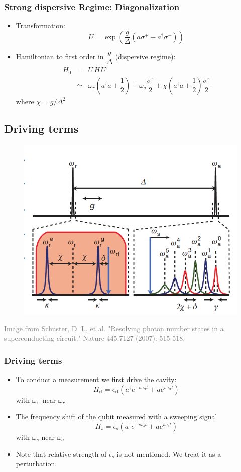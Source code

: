 \documentclass[xcolor=dvipsnames,hyperref={CJKbookmarks=true}]{beamer}
\newcommand{\rf}{\text{rf}}
\begin{document}
\begin{frame}
\frametitle{Strong dispersive Regime: Diagonalization}
\begin{itemize}
\item Transformation: 
$$U=\exp{\left(\dfrac{g}{\Delta}\left(a\sigma^{+}-a^{\dagger}\sigma^{-} \right)\right)}$$
\item Hamiltonian to first order in $\dfrac{g}{\Delta}$ (dispersive regime):
\begin{eqnarray*}
H_0 &=& U\,H\,U^{\dagger}\\
&\simeq &  \omega_r \left(a^{\dagger} a+ \dfrac{1}{2} \right) +  \omega_a \dfrac{\sigma^{z}}{2}+ \chi \left(a^{\dagger}a+\dfrac{1}{2} \right)\dfrac{\sigma^{z}}{2}
\end{eqnarray*}
where $\chi = g/\Delta ^2$
\end{itemize}
\end{frame}

\subsection{Driving terms}
\begin{frame}
\begin{figure}
\centering
\includegraphics[width=0.7\linewidth]{TransitionLines}
\end{figure}
\tiny{\textcolor{gray}{Image from Schuster, D. I., et al. "Resolving photon number states in a superconducting circuit." Nature 445.7127 (2007): 515-518.\cite{schuster2007resolving}}}
\end{frame}

\begin{frame}
\frametitle{Driving terms}
\begin{itemize}
\item To conduct a measurement we first drive the cavity:
$$H_{\rf} = \epsilon_{\rf}\left(a^{\dagger}e^{-i\omega_{\rf}t}+ae^{i\omega_{\rf}t} \right)$$
with $\omega_{\rf}$ near $\omega_r$
\item The frequency shift of the qubit measured with a sweeping signal
$$H_{s} = \epsilon_{s}\left(a^{\dagger}e^{-i\omega_{s}t}+ae^{i\omega_{s}t} \right)$$
with $\omega_{s}$ near $\omega_a$
\item Note that relative strength of $\epsilon_s$ is not mentioned. We treat it 
as a perturbation. 
\end{itemize}
\end{frame}
\end{document}
